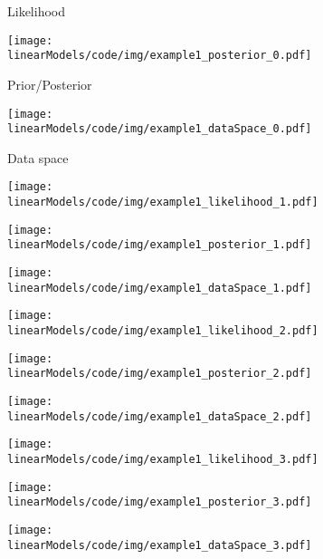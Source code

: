 \begin{figure}[H]

\begin{subfigure}[t]{0.32\textwidth} 
\caption*{Likelihood} 
\end{subfigure}
\begin{subfigure}[t]{0.32\textwidth}
\caption*{Prior/Posterior} 
\texttt{[image: linearModels/code/img/example1\_posterior\_0.pdf]} 
\end{subfigure}
\begin{subfigure}[t]{0.32\textwidth}
\caption*{Data space} 
\texttt{[image: linearModels/code/img/example1\_dataSpace\_0.pdf]} 
\end{subfigure}


\begin{subfigure}[c]{0.32\textwidth}
\texttt{[image: linearModels/code/img/example1\_likelihood\_1.pdf]} 
\end{subfigure}
\begin{subfigure}[c]{0.32\textwidth}
\texttt{[image: linearModels/code/img/example1\_posterior\_1.pdf]} 
\end{subfigure}
\begin{subfigure}[c]{0.32\textwidth}
\texttt{[image: linearModels/code/img/example1\_dataSpace\_1.pdf]} 
\end{subfigure}

\begin{subfigure}[c]{0.32\textwidth}
\texttt{[image: linearModels/code/img/example1\_likelihood\_2.pdf]} 
\end{subfigure}
\begin{subfigure}[c]{0.32\textwidth}
\texttt{[image: linearModels/code/img/example1\_posterior\_2.pdf]} 
\end{subfigure}
\begin{subfigure}[c]{0.32\textwidth}
\texttt{[image: linearModels/code/img/example1\_dataSpace\_2.pdf]} 
\end{subfigure}

\begin{subfigure}[c]{0.32\textwidth}
\texttt{[image: linearModels/code/img/example1\_likelihood\_3.pdf]} 
\end{subfigure}
\begin{subfigure}[c]{0.32\textwidth}
\texttt{[image: linearModels/code/img/example1\_posterior\_3.pdf]} 
\end{subfigure}
\begin{subfigure}[c]{0.32\textwidth}
\texttt{[image: linearModels/code/img/example1\_dataSpace\_3.pdf]} 
\end{subfigure}


\end{figure}
